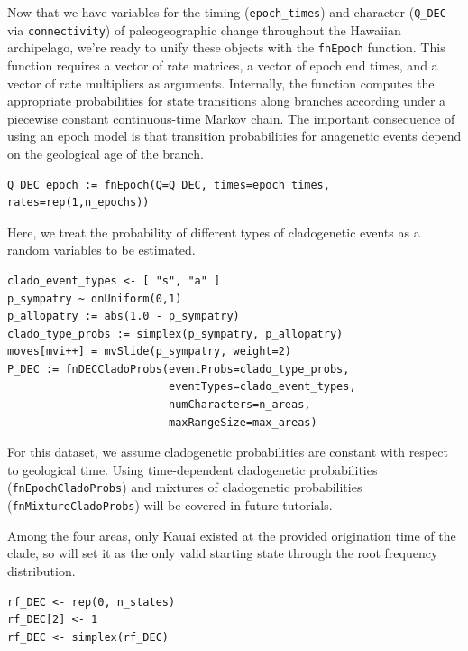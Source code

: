 Now that we have variables for the timing ({\tt epoch\_times}) and character ({\tt Q\_DEC} via {\tt connectivity}) of paleogeographic change throughout the Hawaiian archipelago, we're ready to unify these objects with the {\tt fnEpoch} function.
This function requires a vector of rate matrices, a vector of epoch end times, and a vector of rate multipliers as arguments.
Internally, the function computes the appropriate probabilities for state transitions along branches according under a piecewise constant continuous-time Markov chain.
The important consequence of using an epoch model is that transition probabilities for anagenetic events depend on the geological age of the branch.

\begin{snugshade}
\begin{lstlisting}
Q_DEC_epoch := fnEpoch(Q=Q_DEC, times=epoch_times, rates=rep(1,n_epochs))
\end{lstlisting}
\end{snugshade}

Here, we treat the probability of different types of cladogenetic events as a random variables to be estimated.

\begin{snugshade}
\begin{lstlisting}
clado_event_types <- [ "s", "a" ]
p_sympatry ~ dnUniform(0,1)
p_allopatry := abs(1.0 - p_sympatry)
clado_type_probs := simplex(p_sympatry, p_allopatry)
moves[mvi++] = mvSlide(p_sympatry, weight=2)
P_DEC := fnDECCladoProbs(eventProbs=clado_type_probs,
                         eventTypes=clado_event_types,
                         numCharacters=n_areas,
                         maxRangeSize=max_areas)
\end{lstlisting}
\end{snugshade}

For this dataset, we assume cladogenetic probabilities are constant with respect to geological time.
Using time-dependent cladogenetic probabilities ({\tt fnEpochCladoProbs}) and mixtures of cladogenetic probabilities ({\tt fnMixtureCladoProbs}) will be covered in future tutorials.

Among the four areas, only Kauai existed at the provided origination time of the clade, so will set it as the only valid starting state through the root frequency distribution.

\begin{snugshade}
\begin{lstlisting}
rf_DEC <- rep(0, n_states)
rf_DEC[2] <- 1 
rf_DEC <- simplex(rf_DEC)
\end{lstlisting}
\end{snugshade}

